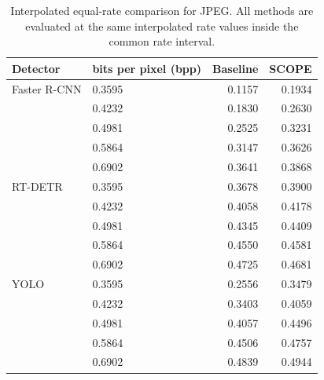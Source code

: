 \begin{table}[t]
\centering
\caption{Interpolated equal-rate comparison for JPEG. All methods are evaluated at the same interpolated rate values inside the common rate interval.}
\label{tab:interpolated_jpeg}
\small
\setlength{\tabcolsep}{6pt}
\begin{tabular}{llrr}
\toprule
Detector & bits per pixel (bpp) & Baseline & SCOPE \\
\midrule
Faster R-CNN & 0.3595 & 0.1157 & 0.1934 \\
 & 0.4232 & 0.1830 & 0.2630 \\
 & 0.4981 & 0.2525 & 0.3231 \\
 & 0.5864 & 0.3147 & 0.3626 \\
 & 0.6902 & 0.3641 & 0.3868 \\
\midrule
RT-DETR & 0.3595 & 0.3678 & 0.3900 \\
 & 0.4232 & 0.4058 & 0.4178 \\
 & 0.4981 & 0.4345 & 0.4409 \\
 & 0.5864 & 0.4550 & 0.4581 \\
 & 0.6902 & 0.4725 & 0.4681 \\
\midrule
YOLO & 0.3595 & 0.2556 & 0.3479 \\
 & 0.4232 & 0.3403 & 0.4059 \\
 & 0.4981 & 0.4057 & 0.4496 \\
 & 0.5864 & 0.4506 & 0.4757 \\
 & 0.6902 & 0.4839 & 0.4944 \\
\bottomrule
\end{tabular}
\end{table}
